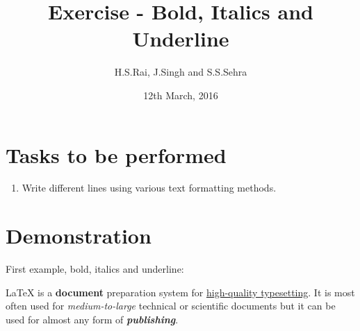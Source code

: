 \documentclass{article}
\title{Exercise  - Bold, Italics and Underline}
\author{H.S.Rai, J.Singh and S.S.Sehra}
\date{12th March, 2016}
\begin{document}
	\maketitle

	\section*{Tasks to be performed}
	\begin{enumerate}
		\item  Write different lines using various text formatting methods. 
	\end{enumerate}
	
\section*{Demonstration}

First example, bold, italics and underline:

LaTeX is a \textbf{document} preparation system for \underline{high-quality typesetting}. It is most often used for \textit{medium-to-large} technical or scientific documents but it can be used for almost any form of \textbf{\textit{publishing}}.
\end{document}
